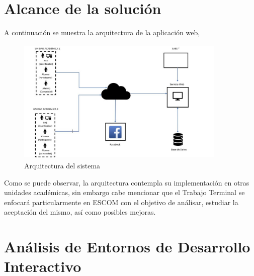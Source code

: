 	\section{Alcance de la solución}
	\noindent A continuación se muestra la arquitectura de la aplicación web,
	\begin{figure}[hbt!]
		\centering
		\includegraphics[width=10cm, height=6cm]{Imagenes/arquitectura}
		\caption{Arquitectura del sistema}
		\label{arquitectura}
	\end{figure}

	\noindent Como se puede observar, la arquitectura contempla su implementación en otras unidades académicas, sin embargo cabe mencionar que el Trabajo Terminal se enfocará particularmente en ESCOM con el objetivo de análisar, estudiar la aceptación del mismo, así como posibles mejoras.
	
	
	\section{An\'alisis de Entornos de Desarrollo Interactivo}
	
